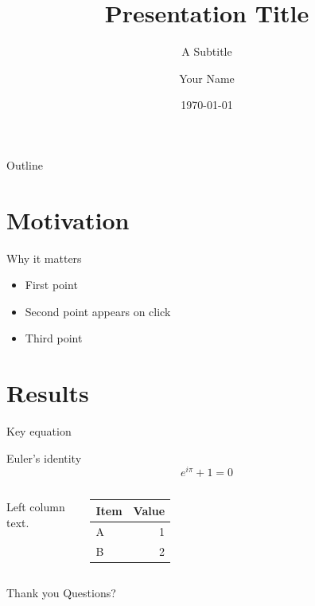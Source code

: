 \documentclass[aspectratio=169]{beamer}
\title{Presentation Title}
\subtitle{A Subtitle}
\author{Your Name}
\institute{Your Institution}
\date{\today}
\begin{document}
\begin{frame}
  \titlepage
\end{frame}

\begin{frame}{Outline}
  \tableofcontents
\end{frame}

\section{Motivation}
\begin{frame}{Why it matters}
  \begin{itemize}
    \item<1-> First point
    \item<2-> Second point appears on click
    \item<3-> Third point
  \end{itemize}
\end{frame}

\section{Results}
\begin{frame}{Key equation}
  \begin{block}{Euler's identity}
    \[ e^{i\pi} + 1 = 0 \]
  \end{block}
  \begin{columns}
      Left column text.
      \begin{tabular}{lr}
        \toprule Item & Value \\ \midrule A & 1 \\ B & 2 \\ \bottomrule
      \end{tabular}
  \end{columns}
\end{frame}

\begin{frame}{Thank you}
  \centering \Large Questions?
\end{frame}
\end{document}
